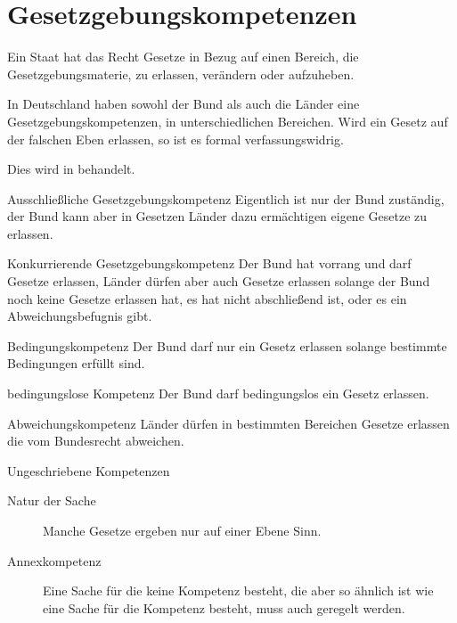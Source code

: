 \documentclass{article}
\begin{document}
\section{Gesetzgebungskompetenzen} 
Ein Staat hat das Recht Gesetze in Bezug auf einen Bereich, die Gesetzgebungsmaterie, zu erlassen, verändern oder aufzuheben.

In Deutschland haben sowohl der Bund als auch die Länder eine Gesetzgebungskompetenzen, in unterschiedlichen Bereichen. Wird ein Gesetz auf der falschen Eben erlassen, so ist es formal verfassungswidrig.

Dies wird in  \GG behandelt.

\begin{description}
 \item{Ausschließliche Gesetzgebungskompetenz} Eigentlich ist nur der Bund zuständig, der Bund kann aber in Gesetzen Länder dazu ermächtigen eigene Gesetze zu erlassen.
 \item{Konkurrierende Gesetzgebungskompetenz} Der Bund hat vorrang und darf Gesetze erlassen, Länder dürfen aber auch Gesetze erlassen solange der Bund noch keine Gesetze erlassen hat, es hat nicht abschließend ist, oder es ein Abweichungsbefugnis gibt.
 \begin{description}
  \item{Bedingungskompetenz} Der Bund darf nur ein Gesetz erlassen solange bestimmte Bedingungen erfüllt sind.
  \item{bedingungslose Kompetenz} Der Bund darf bedingungslos ein Gesetz erlassen.
  \item{Abweichungskompetenz} Länder dürfen in bestimmten Bereichen Gesetze erlassen die vom Bundesrecht abweichen.
 \end{description}
 \item{Ungeschriebene Kompetenzen} 
 \begin{description}
  \item[Natur der Sache] Manche Gesetze ergeben nur auf einer Ebene Sinn.
  \item[Annexkompetenz] Eine Sache für die keine Kompetenz besteht, die aber so ähnlich ist wie eine Sache für die Kompetenz besteht, muss auch geregelt werden.
 \end{description}
\end{description}
\end{document}

